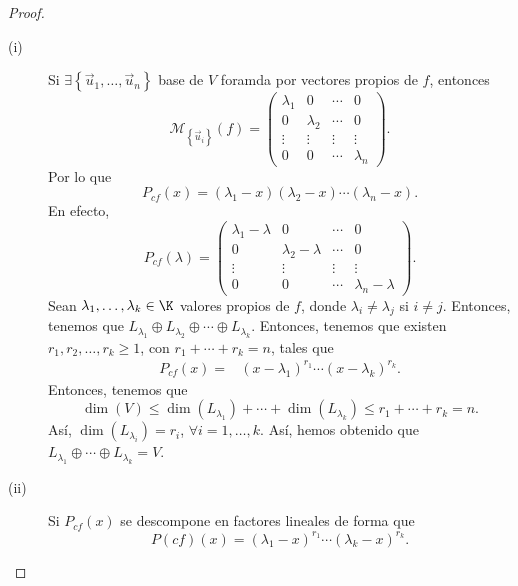 \begin{proof}
\begin{description}
\item[(i)] Si $\displaystyle \exists \left\{ \vec{u}_{1}, \ldots, \vec{u}_{n}\right\}  $ base de $\displaystyle V $ foramda por vectores propios de $\displaystyle f $, entonces
\[\mathcal{M}_{ \left\{ \vec{u}_{i}\right\} }\left(f\right) = \begin{pmatrix} 
	\lambda _{1} & 0 & \cdots & 0 \\
0 & \lambda _{2} & \cdots & 0 \\
\vdots & \vdots & \vdots & \vdots \\
0 & 0 & \cdots & \lambda_{n}\end{pmatrix} .\]
Por lo que 
\[P_{cf}\left(x\right) = \left(\lambda_{1}-x\right)\left(\lambda_{2}-x\right) \cdots \left(\lambda_{n}-x\right) .\]
En efecto, 
\[P_{cf}\left(\lambda \right) = \begin{pmatrix} \lambda _{1} - \lambda & 0 & \cdots & 0 \\
0 & \lambda _{2} - \lambda & \cdots & 0 \\
\vdots & \vdots & \vdots & \vdots \\
0 & 0 & \cdots & \lambda_{n} - \lambda \end{pmatrix} .\]
Sean $\displaystyle \lambda_{1}, \ldots, \lambda_{k} \in \K $ valores propios de $\displaystyle f $, donde $\displaystyle \lambda_{i} \neq \lambda_{j} $ si $\displaystyle i \neq j $. Entonces, tenemos que $\displaystyle L_{\lambda_{1}} \oplus L_{\lambda_{2}} \oplus \cdots \oplus L_{\lambda_{k}} $. Entonces, tenemos que existen $\displaystyle r_{1}, r_{2}, \ldots, r_{k} \geq 1 $, con $\displaystyle r_{1} + \cdots + r_{k}  = n $, tales que
\[
\begin{split}
	P_{cf}\left(x\right) = & \left(x - \lambda_{1}\right)^{r_{1}} \cdots \left(x - \lambda _{k}\right)^{r_{k}} .
\end{split}
\]
Entonces, tenemos que 
\[\dim\left(V\right) \leq \dim\left(L_{\lambda_{1}}\right) + \cdots + \dim\left(L_{\lambda_{k}}\right) \leq r_{1} + \cdots + r_{k} = n .\]
Así, $\displaystyle \dim\left(L_{\lambda_{i}}\right) = r_{i} $, $\displaystyle \forall i = 1, \ldots, k $. Así, hemos obtenido que $\displaystyle L_{\lambda_{1}} \oplus \cdots \oplus L_{\lambda_{k}} = V $.
\item[(ii)] Si $\displaystyle P_{cf}\left(x\right) $ se descompone en factores lineales de forma que 
	\[P\left(cf\right)\left(x\right) = \left(\lambda_{1}-x\right)^{r_{1}}\cdots\left(\lambda_{k}-x\right)^{r_{k}} .\]

\end{description}
\end{proof}
